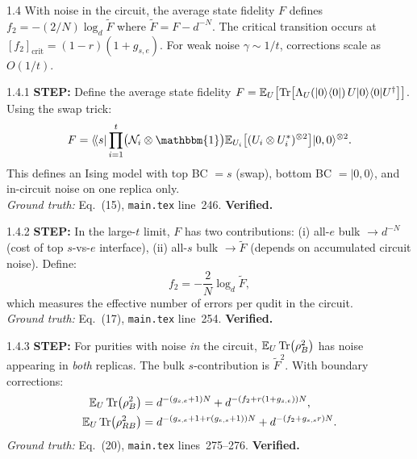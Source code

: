 \documentclass[11pt,a4paper]{article}
\newcommand{\Noise}{\mathcal{N}}
\newcommand{\Ex}{\mathbb{E}}
\begin{document}
\begin{proofnode}{1.4}
With noise in the circuit, the average state fidelity $F$ defines $f_2 = -(2/N)\log_d \tilde{F}$ where $\tilde{F} = F - d^{-N}$. The critical transition occurs at $[f_2]_{\mathrm{crit}} = (1-r)(1+g_{s,e})$. For weak noise $\gamma \sim 1/t$, corrections scale as $O(1/t)$.
\end{proofnode}

\begin{proofnode}{1.4.1}
\textbf{STEP:} Define the average state fidelity $F = \Ex_U\bigl[\Tr[\Lambda_U(|0\rangle\langle 0|)\, U|0\rangle\langle 0|U^\dagger]\bigr]$. Using the swap trick:
\begin{equation}
    F = \langle\!\langle s| \prod_{i=1}^t \bigl(\Noise_i \otimes \mathbbm{1}\bigr) \Ex_{U_i}\bigl[(U_i \otimes U_i^*)^{\otimes 2}\bigr] |0,0\rangle^{\otimes 2}.
    \label{eq:fidelity}
\end{equation}
This defines an Ising model with top BC $= s$ (swap), bottom BC $= |0,0\rangle$, and in-circuit noise on one replica only.\\
\textit{Ground truth:} Eq.~(15), \texttt{main.tex} line~246. \textbf{Verified.}
\end{proofnode}

\begin{proofnode}{1.4.2}
\textbf{STEP:} In the large-$t$ limit, $F$ has two contributions: (i) all-$e$ bulk $\to d^{-N}$ (cost of top $s$-vs-$e$ interface), (ii) all-$s$ bulk $\to \tilde{F}$ (depends on accumulated circuit noise). Define:
\begin{equation}
    f_2 = -\frac{2}{N}\log_d \tilde{F},
    \label{eq:f2_def}
\end{equation}
which measures the effective number of errors per qudit in the circuit.\\
\textit{Ground truth:} Eq.~(17), \texttt{main.tex} line~254. \textbf{Verified.}
\end{proofnode}

\begin{proofnode}{1.4.3}
\textbf{STEP:} For purities with noise \emph{in} the circuit, $\Ex_U \Tr(\rho_B^2)$ has noise appearing in \emph{both} replicas. The bulk $s$-contribution is $\tilde{F}^2$. With boundary corrections:
\begin{align}
    \Ex_U \Tr(\rho_B^2) &= d^{-(g_{s,e}+1)N} + d^{-(f_2 + r(1+g_{s,e}))N}, \label{eq:setupII_purB}\\
    \Ex_U \Tr(\rho_{RB}^2) &= d^{-(g_{s,e}+1+r(g_{e,s}+1))N} + d^{-(f_2+g_{s,s}r)N}. \label{eq:setupII_purRB}
\end{align}
\textit{Ground truth:} Eq.~(20), \texttt{main.tex} lines~275--276. \textbf{Verified.}
\end{proofnode}
\end{document}

